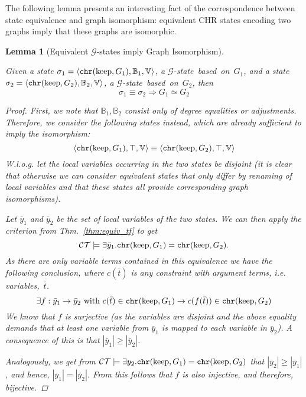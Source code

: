 \documentclass{tlp}
\newtheorem{lemma}[theorem]{Lemma}
\newcommand{\st}[3]{\ensuremath{\langle #1 , #2 , #3 \rangle}}
\newcommand{\CT}{\ensuremath{\mathcal{CT}}}
\newcommand{\mcG}{\ensuremath{\mathcal{G}}}
\newcommand{\bbB}{\ensuremath{\mathbb{B}}}
\newcommand{\bbV}{\ensuremath{\mathbb{V}}}
\DeclareMathOperator{\kp}{keep}
\newcommand{\chr}{\ensuremath{{\tt chr}}}
\begin{document}
The following lemma presents an interesting fact of the correspondence between
state equivalence and graph isomorphism: equivalent CHR states encoding two
graphs imply that these graphs are isomorphic.

\begin{lemma}[Equivalent \mcG-states imply Graph Isomorphism]
\label{lem:eq_iso}

Given a state $\sigma_1 = \st{\chr(\kp, G_1)}{\bbB_1}{\bbV}$, a
\mcG-state~based~on~$G_1$, and a state $\sigma_2 = \st{\chr(\kp,
G_2)}{\bbB_2}{\bbV}$, a \mcG-state~based~on~$G_2$, then \[ \sigma_1 \equiv
\sigma_2 \Rightarrow G_1 \simeq G_2 \]
\begin{proof}

First, we note that $\bbB_1,\bbB_2$ consist only of degree equalities or
adjustments. Therefore, we consider the following states instead, which are
already sufficient to imply the isomorphism: \[
\st{\chr(\kp, G_1)}{\top}{\bbV} \equiv \st{\chr(\kp, G_2)}{\top}{\bbV}
\] W.l.o.g. let the local variables occurring in the two states be disjoint (it
is clear that otherwise we can consider equivalent states that only differ by
renaming of local variables and that these states all provide corresponding graph
isomorphisms).

Let $\bar y_1$ and $\bar y_2$ be the set of local variables of the two states. We
can then apply the criterion from Thm.~\ref{thm:equiv_tf} to get \[ \CT \models
\exists \bar y_1 . \chr(\kp, G_1) = \chr(\kp, G_2). \] As there are only variable
terms contained in this equivalence we have the following conclusion, where
$c(\bar t)$ is any constraint with argument terms, i.e. variables,~$\bar t$. \[
\exists f : \bar y_1 \rightarrow \bar y_2 \text{ with } c(\bar t) \in \chr(\kp,
G_1) \rightarrow c(f(\bar t)) \in \chr(\kp, G_2) \] We know that $f$ is
surjective (as the variables are disjoint and the above equality demands that at
least one variable from $\bar y_1$ is mapped to each variable in $\bar y_2$). A
consequence of this is that $|\bar y_1| \ge |\bar y_2|$.

Analogously, we get from $\CT \models \exists y_2 . \chr(\kp, G_1) = \chr(\kp,
G_2)$ that $|\bar y_2| \ge |\bar y_1|$, and hence, $|\bar y_1| = |\bar y_2|$.
From this follows that $f$ is also injective, and therefore, bijective.


\end{proof}
\end{lemma}
\end{document}
